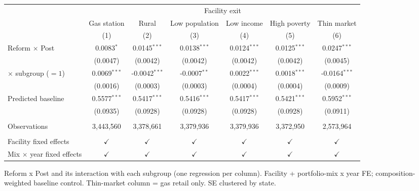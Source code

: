 
\begingroup
\centering
\begin{tabular}{lcccccc}
   \toprule
    & \multicolumn{6}{c}{Facility exit}\\
                                    & Gas station    & Rural           & Low population & Low income     & High poverty   & Thin market \\   
                                    & (1)            & (2)             & (3)            & (4)            & (5)            & (6)\\  
   \midrule 
   Reform $\times$ Post             & 0.0083$^{*}$   & 0.0145$^{***}$  & 0.0138$^{***}$ & 0.0124$^{***}$ & 0.0125$^{***}$ & 0.0247$^{***}$\\   
                                    & (0.0047)       & (0.0042)        & (0.0042)       & (0.0042)       & (0.0042)       & (0.0045)\\   
   \quad $\times$ subgroup ($=1$)   & 0.0069$^{***}$ & -0.0042$^{***}$ & -0.0007$^{**}$ & 0.0022$^{***}$ & 0.0018$^{***}$ & -0.0164$^{***}$\\   
                                    & (0.0016)       & (0.0003)        & (0.0003)       & (0.0004)       & (0.0004)       & (0.0009)\\   
   Predicted baseline               & 0.5577$^{***}$ & 0.5417$^{***}$  & 0.5416$^{***}$ & 0.5417$^{***}$ & 0.5421$^{***}$ & 0.5952$^{***}$\\   
                                    & (0.0935)       & (0.0928)        & (0.0928)       & (0.0928)       & (0.0928)       & (0.0911)\\   
    \\
   Observations                     & 3,443,560      & 3,378,661       & 3,379,936      & 3,379,936      & 3,372,950      & 2,573,964\\  
    \\
   Facility fixed effects           & $\checkmark$   & $\checkmark$    & $\checkmark$   & $\checkmark$   & $\checkmark$   & $\checkmark$\\   
   Mix $\times$ year fixed effects  & $\checkmark$   & $\checkmark$    & $\checkmark$   & $\checkmark$   & $\checkmark$   & $\checkmark$\\   
   \bottomrule
\end{tabular}
 
\par \raggedright 
Reform x Post and its interaction with each subgroup (one regression per column). Facility + portfolio-mix x year FE; composition-weighted baseline control. Thin-market column = gas retail only. SE clustered by state.
\par\endgroup


